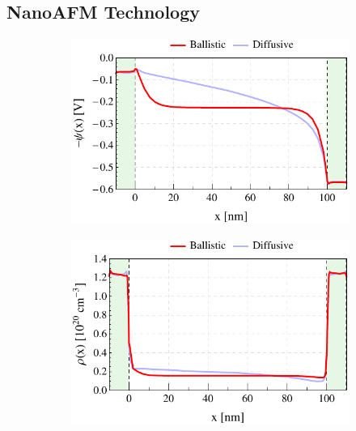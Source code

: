 \documentclass[11pt, a4paper]{article}
\begin{document}
\subsection{NanoAFM Technology }
\Blindtext
\begin{figure}[t]
\centering
	\begin{subfigure}{0.245\linewidth}
		\centering
		\includegraphics[width=1\linewidth]{potxBallDiff100}
		\caption{}\label{fig:1a}
	\end{subfigure}
	\begin{subfigure}{0.245\linewidth}
		\centering
		\includegraphics[width=1\linewidth]{ndxBallDiff100}
		\caption{}\label{fig:1b}
	\end{subfigure}
	\begin{subfigure}{0.245\linewidth}
		\centering

\end{subfigure}
\end{figure}
\end{document}
